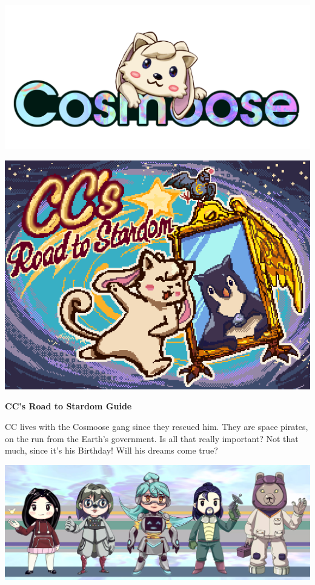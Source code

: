 \documentclass{article}
\newcommand{\bo}[1] {\textbf{#1}}
\newcommand{\bckg}[1]{\AddToShipoutPictureBG*{\texttt{[image: \#1]}}}
\begin{document}
\bckg{img/bg}
\begin{center}
    \includegraphics[height=.2\paperheight]{img/cclogo}

    \includegraphics[height=.5\paperheight]{img/loading}

    \vspace{.5cm}
    {\Huge \bo{CC's Road to Stardom Guide}}
\end{center}

\clearpage

\bckg{img/bg}

CC lives with the Cosmoose gang since they rescued him.
They are space pirates, on the run from the Earth's government. Is all that really important?
Not that much, since it's his Birthday! Will his dreams come true?

\begin{center}
    \includegraphics[height=.25\paperheight]{img/crew}
\end{center}
\end{document}
